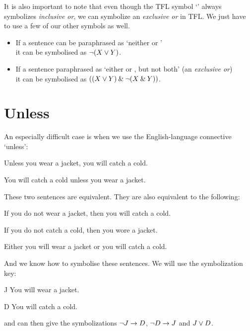 It is also important to note that even though the TFL symbol `\eor' always symbolizes \emph{inclusive or}, we can symbolize an \emph{exclusive or} in {TFL}. We just have to use a few of our other symbols as well.

\begin{highlighted}
\begin{itemize}
\item If a sentence can be paraphrased as `neither \metaX or \metaY' \\it can be symbolised as $\neg(X\vee Y)$.
\item If a sentence paraphrased as `either \metaX or \metaY, but not both' (an \emph{exclusive or}) \\it can be symbolised as $((X \vee Y) \mathbin{\&} \neg(X \mathbin{\&} Y))$.
\end{itemize}
\end{highlighted}

\section{Unless}
An especially difficult case is when we use the English-language connective `unless':

\begin{earg}
\item[\ex{unless1}] Unless you wear a jacket, you will catch a cold.
\item[\ex{unless2}] You will catch a cold unless you wear a jacket.
\end{earg}
These two sentences are equivalent. They are also equivalent to the following:
\begin{earg}
\item[\ex{unless3}]  If you do not wear a jacket, then you will catch a cold.
\item[\ex{unless4}]  If you do not catch a cold, then you wore a jacket.
\item [\ex{unless5}] Either you will wear a jacket or you will catch a cold.
\end{earg}
And we know how to symbolise these sentences. We will use the symbolization key:
	\begin{ekey}
		\item[J] You will wear a jacket.
		\item[D] You will catch a cold.
	\end{ekey} and can then give the symbolizations $\neg J \rightarrow D$, $\neg D \rightarrow J$ and $J \vee D$.

